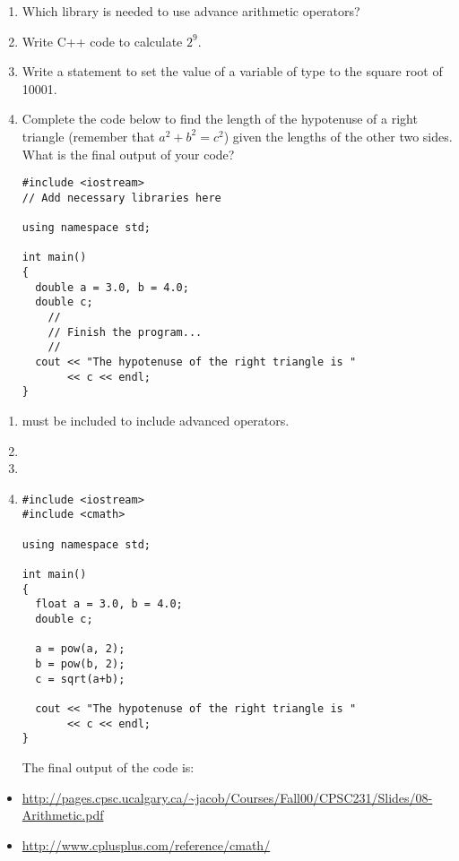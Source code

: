\begin{enumerate}
\item Which  library is needed to use advance arithmetic operators?

\item Write C++ code to calculate $2^9$.

\item Write a statement to set the value of a variable of type  to the square root of 10001.

\item Complete the code below to find the length of the hypotenuse of a right triangle (remember that $a^2 + b^2 = c^2$) given the lengths of the other two sides. What is the final output of your code?

\noindent\begin{minipage}{\linewidth}\begin{lstlisting}
#include <iostream>
// Add necessary libraries here

using namespace std;

int main()
{
  double a = 3.0, b = 4.0;
  double c;
	//
	// Finish the program...
	//
  cout << "The hypotenuse of the right triangle is "
       << c << endl;
}
\end{lstlisting}\end{minipage}

\end{enumerate}

\begin{enumerate}
\item {} must be included to include advanced operators.
\item {}
\item {}
\item
\noindent\begin{minipage}{\linewidth}\begin{lstlisting}
#include <iostream>
#include <cmath>

using namespace std;

int main()
{
  float a = 3.0, b = 4.0;
  double c;
	
  a = pow(a, 2);
  b = pow(b, 2);
  c = sqrt(a+b);

  cout << "The hypotenuse of the right triangle is "
       << c << endl;
}
\end{lstlisting}\end{minipage}

The final output of the code is: 


\end{enumerate}

\begin{itemize}
\item \url{http://pages.cpsc.ucalgary.ca/~jacob/Courses/Fall00/CPSC231/Slides/08-Arithmetic.pdf}
\item \url{http://www.cplusplus.com/reference/cmath/}
\end{itemize}
